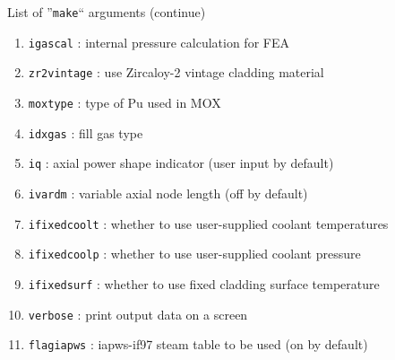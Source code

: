 \begin{frame}{List of ''\texttt{make}`` arguments (continue)}
  
  \footnotesize

  \begin{block}{}
    \begin{enumerate}\addtocounter{enumi}{11}
    \item \texttt{igascal}        : internal pressure calculation for FEA
    \item \texttt{zr2vintage}     : use Zircaloy-2 vintage cladding material
    \item \texttt{moxtype}        : type of Pu used in MOX
    \item \texttt{idxgas}         : fill gas type
    \item \texttt{iq}             : axial power shape indicator (user input by default)
    \item \texttt{ivardm}         : variable axial node length (off by default)
    \item \texttt{ifixedcoolt}    : whether to use user-supplied coolant temperatures
    \item \texttt{ifixedcoolp}    : whether to use user-supplied coolant pressure
    \item \texttt{ifixedsurf}     : whether to use fixed cladding surface temperature
    \item \texttt{verbose}        : print output data on a screen
    \item \texttt{flagiapws}      : iapws-if97 steam table to be used (on by default)
    \end{enumerate}
  \end{block}

\end{frame}

